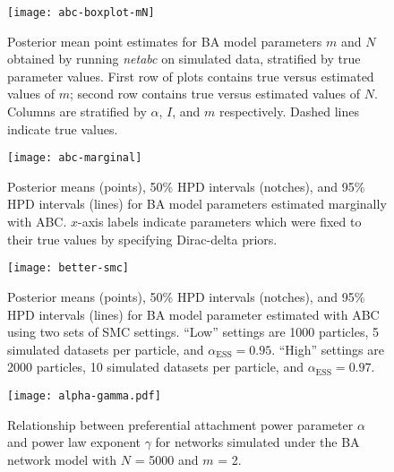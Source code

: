 \documentclass[12pt]{article}\usepackage[]{graphicx}\usepackage[]{color}
\begin{document}
\begin{figure}
    \texttt{[image: abc-boxplot-mN]}
    \caption[
        Posterior mean point estimates for BA model parameters $m$ and $N$
        obtained by running \textit{netabc} on simulated data, stratified by
        true parameter values.
    ]{
        Posterior mean point estimates for BA model parameters $m$ and $N$
        obtained by running \textit{netabc} on simulated data, stratified by
        true parameter values. First row of plots contains true versus
        estimated values of $m$; second row contains true versus estimated
        values of $N$. Columns are stratified by $\alpha$, $I$, and $m$
        respectively. Dashed lines indicate true values. 
    }
    \label{fig:abcpt2}
\end{figure}

\begin{figure}
    \texttt{[image: abc-marginal]}
    \caption[
        Posterior means, 50\% HPD intervals, and 95\% HPD intervals for BA
        model parameters estimated marginally with ABC.
    ]{
        Posterior means (points), 50\% HPD intervals (notches), and 95\% HPD
        intervals (lines) for BA model parameters estimated marginally with
        ABC. $x$-axis labels indicate parameters which were fixed to their true
        values by specifying Dirac-delta priors.
    }
    \label{fig:marginal}
\end{figure}

\begin{figure}
    \centering
    \texttt{[image: better-smc]}
    \caption[
        Posterior means, 50\% HPD intervals, and 95\% HPD intervals for BA
        model parameters estimated with ABC using two sets of SMC settings.
    ]{
        Posterior means (points), 50\% HPD intervals (notches), and 95\% HPD
        intervals (lines) for BA model parameter estimated with ABC using two
        sets of SMC settings. ``Low'' settings are 1000 particles, 5 simulated
        datasets per particle, and $\alpha_{\text{ESS}} = 0.95$. ``High''
        settings are 2000 particles, 10 simulated datasets per particle, and
        $\alpha_{\text{ESS}} = 0.97.$
    }
    \label{fig:better}
\end{figure}

\begin{figure}[ht]
  \centering
  \texttt{[image: alpha-gamma.pdf]}
  \caption{
      Relationship between preferential attachment power parameter $\alpha$
      and power law exponent $\gamma$ for networks simulated under the BA
      network model with $N$ = 5000 and $m$ = 2.
  }
  \label{fig:gamma}
\end{figure}
\end{document}
